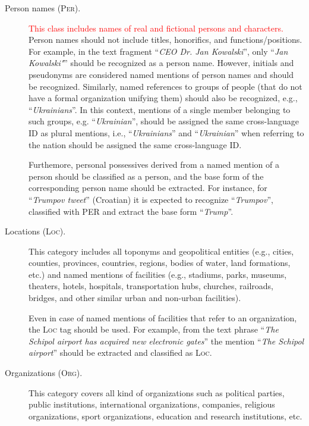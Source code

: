 \documentclass[11pt]{article}
\newcommand{\alert}[1]{\textcolor{red}{#1}}
\begin{document}
\begin{description}

\item[Person names (\textsc{Per}).] \alert{This class includes names of
real and fictional persons and characters.} Person names should not include
titles, honorifics, and functions/positions. For example, in the text fragment
``\textit{CEO Dr. Jan Kowalski}'', only ``\textit{Jan Kowalski"}'' should be
recognized as a person name. However, initials and pseudonyms are considered
named mentions of person names and should be recognized.  Similarly, named
references to groups of people (that do not have a formal organization unifying
them) should also be recognized, e.g., ``\textit{Ukrainians}''. In this
context, mentions of a single member belonging to such groups, e.g.
``\textit{Ukrainian}'', should be assigned the same cross-language ID as plural
mentions, i.e., ``\textit{Ukrainians}'' and ``\textit{Ukrainian}'' when
referring to the nation should be assigned the same cross-language ID.	

  Furthemore, personal possessives derived from a named mention of a person should
  be classified as a person, and the base form of the corresponding
  person name should be extracted. For instance, for
  ``\textit{Trumpov tweet}'' (Croatian) it is expected to recognize
  ``\textit{Trumpov}'', classified with PER and extract the base
  form ``\textit{Trump}''.


\item[Locations (\textsc{Loc}).]

This category includes all toponyms and geopolitical entities (e.g., cities,
counties, provinces, countries, regions, bodies of water, land formations,
etc.) and named mentions of facilities (e.g., stadiums, parks, museums,
theaters, hotels, hospitals, transportation hubs, churches, railroads, bridges,
and other similar urban and non-urban facilities).

Even in case of named mentions of facilities that refer to an organization, the
\textsc{Loc} tag should be used. For example, from the text phrase
``\textit{The Schipol airport has acquired new electronic gates}'' the mention
``\textit{The Schipol airport}'' should be extracted and classified as
\textsc{Loc}.

\item[Organizations (\textsc{Org}).]

This category covers all kind of organizations such as political parties,
public institutions, international organizations, companies, religious
organizations, sport organizations, education and research institutions, etc.


\end{description}
\end{document}
